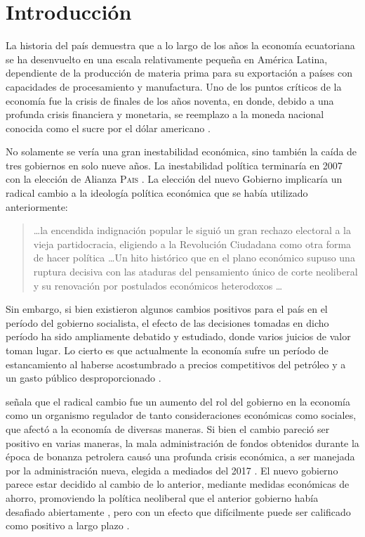 \documentclass[12pt,a4paper,twoside]{article}
\begin{document}
\tableofcontents
\listoffigures
\listoftables
\clearpage


\section{Introducción}\label{sec:intro}

La historia del país demuestra que a lo largo de los años la economía ecuatoriana se ha desenvuelto en una escala relativamente pequeña en América Latina, dependiente de la producción de materia prima para su exportación a países con capacidades de procesamiento y manufactura. Uno de los puntos críticos de la economía fue la crisis de finales de los años noventa, en donde, debido a una profunda crisis financiera y monetaria, se reemplazo a la moneda nacional conocida como el sucre por el dólar americano \parencite{dolarbce}.

No solamente se vería una gran inestabilidad económica, sino también la caída de tres gobiernos en solo nueve años. La inestabilidad política terminaría en 2007 con la elección de Alianza \textsc{Pais} \parencite{20002014inec}. La elección del nuevo Gobierno implicaría un radical cambio a la ideología política económica que se había utilizado anteriormente:
\blockquote{
    \ldots la encendida indignación popular le siguió un gran rechazo electoral a la vieja partidocracia, eligiendo a la Revolución Ciudadana como otra forma de hacer política \ldots Un hito histórico que en el plano económico supuso una ruptura decisiva con las ataduras del pensamiento único de corte neoliberal y su renovación por postulados económicos heterodoxos \ldots \parencite[pp.~11-12]{paislibro} 
    }
Sin embargo, si bien existieron algunos cambios positivos para el país en el período del gobierno socialista, el efecto de las decisiones tomadas en dicho período ha sido ampliamente debatido y estudiado, donde varios juicios de valor toman lugar. Lo cierto es que actualmente la economía sufre un período de estancamiento al haberse acostumbrado a precios competitivos del petróleo y a un gasto público desproporcionado \parencite{ladesaceleracioncorporaciondeestudiosparaeldesarrollo, elcrecimientocorporaciondeestudiosparaeldesarrollo,cuestionesbce, laeramosquera&vaca}.

\textcite{hechosluciopablo} señala que el radical cambio fue un aumento del rol del gobierno en la economía como un organismo regulador de tanto consideraciones económicas como sociales, que afectó a la economía de diversas maneras. Si bien el cambio pareció ser positivo en varias maneras, la mala administración de fondos obtenidos durante la época de bonanza petrolera causó una profunda crisis económica, a ser manejada por la administración nueva, elegida a mediados del 2017 \parencite{latrampalatorre&hidalgopallares}. El nuevo gobierno parece estar decidido al cambio de lo anterior, mediante medidas económicas de ahorro, promoviendo la política neoliberal que el anterior gobierno había desafiado abiertamente \parencite{deficitfiscaldavalos}, pero con un efecto que difícilmente puede ser calificado como positivo a largo plazo \parencite{elcrecimientocorporaciondeestudiosparaeldesarrollo}.
\end{document}

